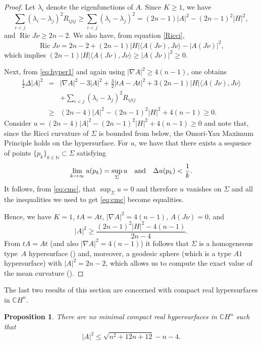 \documentclass[11pt]{amsart}
\theoremstyle{plain}
\newtheorem{proposition}  [theorem]  {Proposition}
\theoremstyle{definition}
\DeclareMathOperator{\ric}{Ric}
\numberwithin{equation}{section}
\begin{document}
\begin{proof} Let $\lambda_i$ denote the eigenfunctions of $A$. Since $K\geq 1$, we have
$$
\sum_{i<j}(\lambda_i-\lambda_j)^2R_{ijij}\geq\sum_{i<j}(\lambda_i-\lambda_j)^2=(2n-1)|A|^2-(2n-1)^2|H|^2,
$$
and $\ric J\nu\geq 2n-2$. We also have, from equation \eqref{Ricci},
$$
\ric J\nu=2n-2+(2n-1)|H|\langle A(J\nu),J\nu\rangle-|A(J\nu)|^2,
$$
which implies $(2n-1)|H|\langle A(J\nu),J\nu\rangle\geq|A(J\nu)|^2\geq 0$.

Next, from \eqref{eq:hyper1} and again using $|\nabla A|^2\geq 4(n-1)$, one obtains
\begin{eqnarray}\label{eq:cmc}
\frac{1}{2}\Delta|A|^2&=&|\nabla A|^2-3|A|^2+\frac{3}{2}|tA-At|^2+3(2n-1)|H|\langle A(J\nu),J\nu\rangle\\\nonumber &&+\sum_{i<j}(\lambda_i-\lambda_j)^2R_{ijij}\\\nonumber&\geq&(2n-4)|A|^2-(2n-1)^2|H|^2+4(n-1)\geq 0.
\end{eqnarray}
Consider $u=(2n-4)|A|^2-(2n-1)^2|H|^2+4(n-1)\geq 0$ and note that, since the Ricci curvature of $\Sigma$ is bounded from below, the Omori-Yau Maximum Principle holds on the hypersurface. For $u$, we have that there exists a sequence of points $\{p_k\}_{k\in\mathbb{N}}\subset\Sigma$ satisfying
$$
\lim_{k\rightarrow\infty}u(p_k)=\sup_{\Sigma}u\quad\textnormal{and}\quad\Delta u(p_k)<\frac{1}{k}.
$$
It follows, from \eqref{eq:cmc}, that $\sup_{\Sigma}u=0$ and therefore $u$ vanishes on $\Sigma$ and all the inequalities we used to get \eqref{eq:cmc} become equalities. 

Hence, we have $K=1$, $tA=At$, $|\nabla A|^2=4(n-1)$, $A(J\nu)=0$, and
$$
|A|^2\geq\frac{(2n-1)^2|H|^2-4(n-1)}{2n-4}.
$$
From $tA=At$ (and also $|\nabla A|^2=4(n-1)$) it follows that $\Sigma$ is a homogeneous type~$A$ hypersurface (\cite[Theorem 4.1]{NR}) and, moreover, a geodesic sphere (which is a type $A1$ hypersurface) with $|A|^2=2n-2$, which allows us to compute the exact value of the mean curvature (\cite[Theorems 3.13, 3.14]{NR}).
\end{proof}

The last two results of this section are concerned with compact real hypersurfaces in $\mathbb{C}H^n$.

\begin{proposition}\label{min_chn} There are no minimal compact real hypersurfaces in $\mathbb{C}H^n$ such that
\begin{equation}\label{ineq}
|A|^2\leq\sqrt{n^2+12n+12}-n-4.
\end{equation}
\end{proposition}
\end{document}
